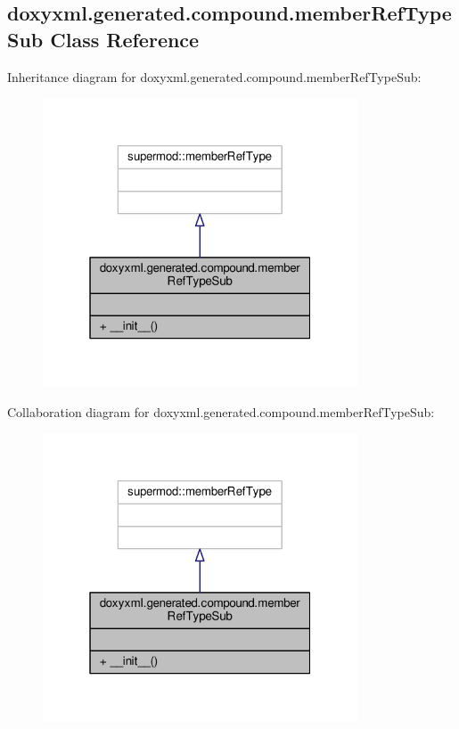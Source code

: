 \subsection{doxyxml.\+generated.\+compound.\+member\+Ref\+Type\+Sub Class Reference}
\label{classdoxyxml_1_1generated_1_1compound_1_1memberRefTypeSub}


Inheritance diagram for doxyxml.\+generated.\+compound.\+member\+Ref\+Type\+Sub\+:
\nopagebreak
\begin{figure}[H]
\begin{center}
\leavevmode
\includegraphics[width=265pt]{d0/d07/classdoxyxml_1_1generated_1_1compound_1_1memberRefTypeSub__inherit__graph}
\end{center}
\end{figure}


Collaboration diagram for doxyxml.\+generated.\+compound.\+member\+Ref\+Type\+Sub\+:
\nopagebreak
\begin{figure}[H]
\begin{center}
\leavevmode
\includegraphics[width=265pt]{dc/db3/classdoxyxml_1_1generated_1_1compound_1_1memberRefTypeSub__coll__graph}
\end{center}
\end{figure}
